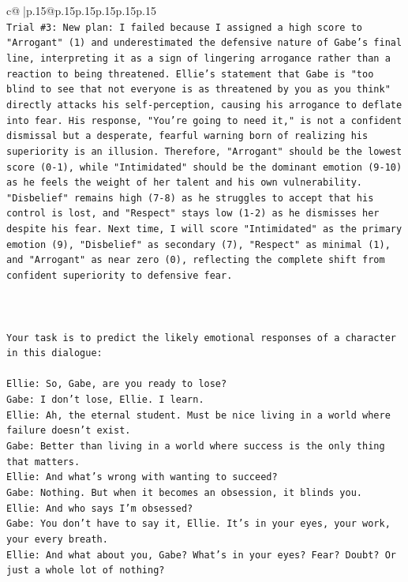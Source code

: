 \documentclass{article}
\begin{document}
{\begin{supertabular}{c@{$\;$}|p{.15\linewidth}@{}p{.15\linewidth}p{.15\linewidth}p{.15\linewidth}p{.15\linewidth}p{.15\linewidth}}
{{{\\ 
\texttt{Trial \#3: New plan: I failed because I assigned a high score to "Arrogant" (1) and underestimated the defensive nature of Gabe's final line, interpreting it as a sign of lingering arrogance rather than a reaction to being threatened. Ellie's statement that Gabe is "too blind to see that not everyone is as threatened by you as you think" directly attacks his self{-}perception, causing his arrogance to deflate into fear. His response, "You're going to need it," is not a confident dismissal but a desperate, fearful warning born of realizing his superiority is an illusion. Therefore, "Arrogant" should be the lowest score (0{-}1), while "Intimidated" should be the dominant emotion (9{-}10) as he feels the weight of her talent and his own vulnerability. "Disbelief" remains high (7{-}8) as he struggles to accept that his control is lost, and "Respect" stays low (1{-}2) as he dismisses her despite his fear. Next time, I will score "Intimidated" as the primary emotion (9), "Disbelief" as secondary (7), "Respect" as minimal (1), and "Arrogant" as near zero (0), reflecting the complete shift from confident superiority to defensive fear.} \\
\\ 
\\ 
\\ 
\texttt{Your task is to predict the likely emotional responses of a character in this dialogue:} \\
\\ 
\texttt{Ellie: So, Gabe, are you ready to lose?} \\
\texttt{Gabe: I don't lose, Ellie. I learn.} \\
\texttt{Ellie: Ah, the eternal student. Must be nice living in a world where failure doesn't exist.} \\
\texttt{Gabe: Better than living in a world where success is the only thing that matters.} \\
\texttt{Ellie: And what's wrong with wanting to succeed? } \\
\texttt{Gabe: Nothing. But when it becomes an obsession, it blinds you.} \\
\texttt{Ellie: And who says I'm obsessed?} \\
\texttt{Gabe: You don't have to say it, Ellie. It's in your eyes, your work, your every breath.} \\
\texttt{Ellie: And what about you, Gabe? What's in your eyes? Fear? Doubt? Or just a whole lot of nothing?} \\
}}}
\end{supertabular}}
\end{document}
